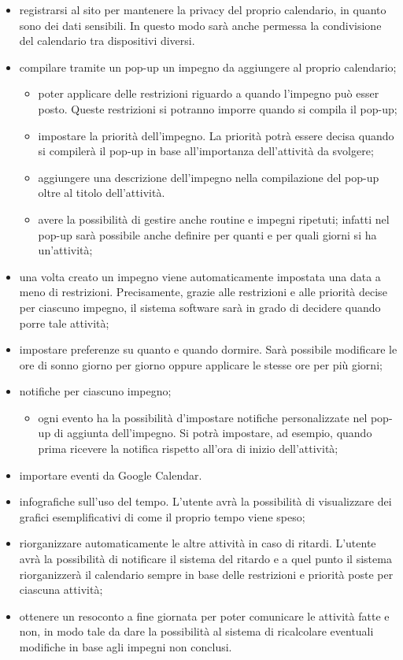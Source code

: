 \begin{itemize}
    \item registrarsi al sito per mantenere la privacy del proprio calendario, in quanto sono dei dati sensibili. In questo modo
      sarà anche permessa la condivisione del calendario tra dispositivi diversi.
    \item compilare tramite un pop-up un impegno da aggiungere al proprio calendario;
          \begin{itemize}
              \item poter applicare delle restrizioni riguardo a quando l'impegno può esser posto. Queste
                    restrizioni si potranno imporre quando si compila il pop-up;
              \item impostare la priorità dell'impegno. La priorità potrà essere decisa quando si compilerà il pop-up in base all'importanza dell'attività da svolgere;
              \item aggiungere una descrizione dell'impegno nella compilazione del pop-up oltre al titolo dell'attività.
              \item avere la possibilità di gestire anche routine e impegni ripetuti; infatti nel pop-up sarà possibile anche definire per quanti e per quali giorni si ha un'attività;
          \end{itemize}
    \item una volta creato un impegno viene automaticamente impostata una data a meno di restrizioni. Precisamente, grazie alle restrizioni e alle priorità decise per ciascuno
          impegno, il sistema software sarà in grado di decidere quando porre tale attività;
    \item impostare preferenze su quanto e quando dormire. Sarà possibile modificare le ore di sonno giorno per giorno oppure
          applicare le stesse ore per più giorni;
    \item notifiche per ciascuno impegno;
          \begin{itemize}
              \item ogni evento ha la possibilità d'impostare notifiche personalizzate nel pop-up di aggiunta dell'impegno. Si potrà impostare, ad esempio, quando prima ricevere la notifica rispetto all'ora di inizio dell'attività;
          \end{itemize}
    \item importare eventi da Google Calendar.
    \item infografiche sull'uso del tempo. L'utente avrà la possibilità di visualizzare dei grafici esemplificativi di come il proprio
          tempo viene speso;
    \item riorganizzare automaticamente le altre attività in caso di ritardi. L'utente avrà la possibilità di notificare il sistema del ritardo e
          a quel punto il sistema riorganizzerà il calendario sempre in base delle restrizioni e priorità poste per ciascuna attività;
    \item ottenere un resoconto a fine giornata per poter comunicare le attività fatte e non, in modo tale da dare la possibilità al sistema di ricalcolare eventuali modifiche in base agli impegni non conclusi.
\end{itemize}

